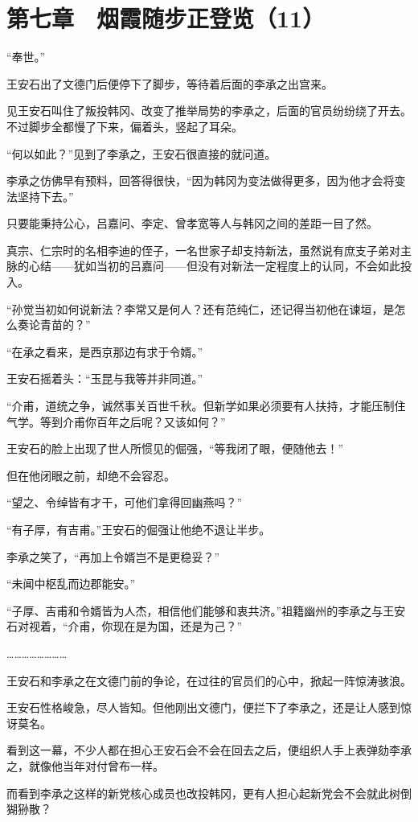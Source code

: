 \section{第七章　烟霞随步正登览（11）}

“奉世。”

王安石出了文德门后便停下了脚步，等待着后面的李承之出宫来。

见王安石叫住了叛投韩冈、改变了推举局势的李承之，后面的官员纷纷绕了开去。不过脚步全都慢了下来，偏着头，竖起了耳朵。

“何以如此？”见到了李承之，王安石很直接的就问道。

李承之仿佛早有预料，回答得很快，“因为韩冈为变法做得更多，因为他才会将变法坚持下去。”

只要能秉持公心，吕嘉问、李定、曾孝宽等人与韩冈之间的差距一目了然。

真宗、仁宗时的名相李迪的侄子，一名世家子却支持新法，虽然说有庶支子弟对主脉的心结——犹如当初的吕嘉问——但没有对新法一定程度上的认同，不会如此投入。

“孙觉当初如何说新法？李常又是何人？还有范纯仁，还记得当初他在谏垣，是怎么奏论青苗的？”

“在承之看来，是西京那边有求于令婿。”

王安石摇着头：“玉昆与我等并非同道。”

“介甫，道统之争，诚然事关百世千秋。但新学如果必须要有人扶持，才能压制住气学。等到介甫你百年之后呢？又该如何？”

王安石的脸上出现了世人所惯见的倔强，“等我闭了眼，便随他去！”

但在他闭眼之前，却绝不会容忍。

“望之、令绰皆有才干，可他们拿得回幽燕吗？”

“有子厚，有吉甫。”王安石的倔强让他绝不退让半步。

李承之笑了，“再加上令婿岂不是更稳妥？”

“未闻中枢乱而边郡能安。”

“子厚、吉甫和令婿皆为人杰，相信他们能够和衷共济。”祖籍幽州的李承之与王安石对视着，“介甫，你现在是为国，还是为己？”

……………………

王安石和李承之在文德门前的争论，在过往的官员们的心中，掀起一阵惊涛骇浪。

王安石性格峻急，尽人皆知。但他刚出文德门，便拦下了李承之，还是让人感到惊讶莫名。

看到这一幕，不少人都在担心王安石会不会在回去之后，便组织人手上表弹劾李承之，就像他当年对付曾布一样。

而看到李承之这样的新党核心成员也改投韩冈，更有人担心起新党会不会就此树倒猢狲散？

